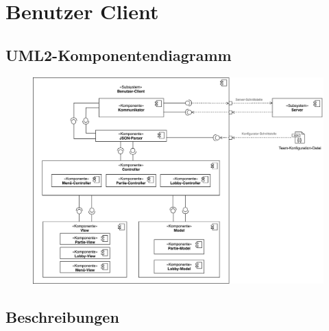 \section{Benutzer Client}

	\subsection{UML2-Komponentendiagramm}
		\begin{center}
			\begin{figure}[H]
    		\centering
    		\includegraphics[scale=0.13]{images/komponentendiagramm_benutzer-client.png}
		\end{figure}
		\end{center}
		

	\subsection{Beschreibungen}

